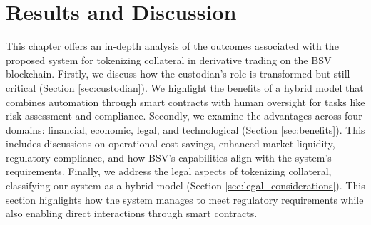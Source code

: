 \chapter{Results and Discussion}
\label{ch:resultsDiscussion}
This chapter offers an in-depth analysis of the outcomes associated with the proposed system for tokenizing collateral in derivative trading on the BSV blockchain. Firstly, we discuss how the custodian's role is transformed but still critical (Section \ref{sec:custodian}). We highlight the benefits of a hybrid model that combines automation through smart contracts with human oversight for tasks like risk assessment and compliance. Secondly, we examine the advantages across four domains: financial, economic, legal, and technological (Section \ref{sec:benefits}). This includes discussions on operational cost savings, enhanced market liquidity, regulatory compliance, and how BSV's capabilities align with the system's requirements. Finally, we address the legal aspects of tokenizing collateral, classifying our system as a hybrid model (Section \ref{sec:legal_considerations}). This section highlights how the system manages to meet regulatory requirements while also enabling direct interactions through smart contracts.